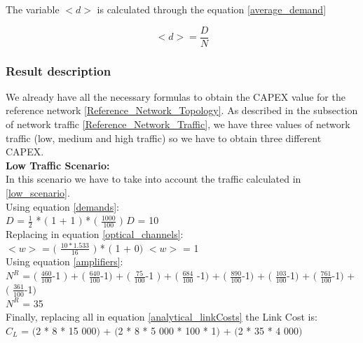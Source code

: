 The variable $<d>$ is calculated through the equation \ref{average_demand}

\begin{equation}
<d> = \frac{D}{N}
\label{average_demand}
\end{equation}


\subsubsection{Result description}

We already have all the necessary formulas to obtain the CAPEX value for the reference network \ref{Reference_Network_Topology}. As described in the subsection of network traffic \ref{Reference_Network_Traffic}, we have three values of network traffic (low, medium and high traffic) so we have to obtain three different CAPEX.\\

\textbf{Low Traffic Scenario:}\\
In this scenario we have to take into account the traffic calculated in \ref{low_scenario}.\\

Using equation \ref{demands}:\\

$D$ = $\frac{1}{2}$ * $($ 1 + 1 $)$ * $($ $\frac{1000}{100}$ $)$ \qquad \qquad $D$ = 10\\

Replacing in equation \ref{optical_channels}:\\

$<w>$ = $($ $\frac{10 * 1.533}{16}$ $)$ * $($ 1 + 0$)$ \qquad \qquad $<w>$ = 1\\

Using equation \ref{amplifiers}:\\

$N^R$ = $($ $\frac{460}{100}$-1 $)$ + $($ $\frac{640}{100}$-1$)$ + $($ $\frac{75}{100}$-1 $)$ + $($ $\frac{684}{100}$ -1$)$ + $($ $\frac{890}{100}$-1$)$ + $($ $\frac{103}{100}$-1$)$ + $($ $\frac{761}{100}$-1$)$ + $($ $\frac{361}{100}$-1$)$\\

$N^R$ = 35\\

Finally, replacing all in equation \ref{analytical_linkCosts} the Link Cost is:\\

$C_L$ = $($2 * 8 * 15 000$)$ + $($2 * 8 * 5 000 * 100 * 1$)$ + $($2 * 35 * 4 000$)$\\

